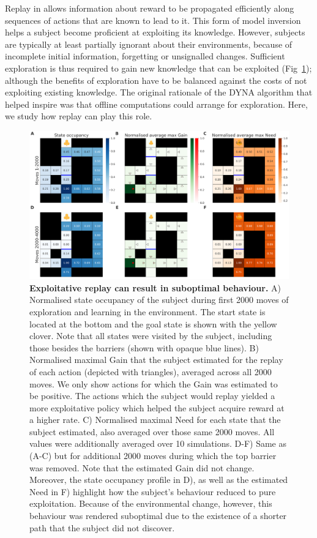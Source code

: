 Replay in \textcite{mattarPrioritizedMemoryAccess2018} allows information about reward to be propagated efficiently along sequences of actions that are known to lead to it. This form of model inversion helps a subject  become  proficient at exploiting its knowledge. However, subjects are typically at least partially ignorant about their environments,  because of incomplete initial information, forgetting or unsignalled changes. Sufficient exploration is thus required to gain  new knowledge that can be exploited (Fig~\ref{fig:fig1}); although the benefits of exploration have to be balanced against the costs of not exploiting existing knowledge. The original rationale of the DYNA algorithm \parencite{suttonDynaIntegratedArchitecture1991} that helped inspire \textcite{mattarPrioritizedMemoryAccess2018} was that offline computations could arrange for exploration. Here, we study how replay can play this role.

\begin{figure}[h!]
    \centering
    \includegraphics[width=1\textwidth]{Figures/fig1.png}
    \caption{\footnotesize \textbf{Exploitative replay can result in suboptimal behaviour.} A) Normalised state occupancy of the subject during first 2000 moves of exploration and learning in the environment. The start state is located at the bottom and the goal state is shown with the yellow clover. Note that all states were visited by the subject, including those besides the barriers (shown with opaque blue lines). B) Normalised maximal Gain that the subject estimated for the replay of each action (depicted with triangles), averaged across all 2000 moves. We only show actions for which the Gain was estimated to be positive. The actions which the subject would replay yielded a more exploitative policy which helped the subject acquire reward at a higher rate. C) Normalised maximal Need for each state that the subject estimated, also averaged over those same 2000 moves. All values were additionally averaged over 10 simulations. D-F) Same as (A-C) but for additional 2000 moves during which the top barrier was removed. Note that the estimated Gain did not change. Moreover, the state occupancy profile in D), as well as the estimated Need in F) highlight how the subject's behaviour reduced to pure exploitation. Because of the environmental change, however, this behaviour was rendered suboptimal due to the existence of a shorter path  that the subject  did not discover.}
    \label{fig:fig1}
\end{figure}

